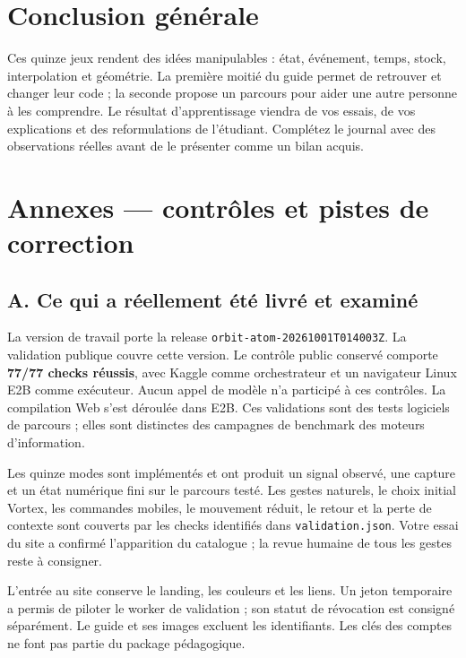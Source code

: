 \documentclass[
  canadien,
  11pt,
  letterpaper,
]{article}
\begin{document}
\section{Conclusion générale}\label{conclusion-guxe9nuxe9rale}

Ces quinze jeux rendent des idées manipulables : état, événement, temps,
stock, interpolation et géométrie. La première moitié du guide permet de
retrouver et changer leur code ; la seconde propose un parcours pour
aider une autre personne à les comprendre. Le résultat d'apprentissage
viendra de vos essais, de vos explications et des reformulations de
l'étudiant. Complétez le journal avec des observations réelles avant de
le présenter comme un bilan acquis.

\section{Annexes --- contrôles et pistes de
correction}\label{annexes-contruxf4les-et-pistes-de-correction}

\subsection{A. Ce qui a réellement été livré et
examiné}\label{a.-ce-qui-a-ruxe9ellement-uxe9tuxe9-livruxe9-et-examinuxe9}

La version de travail porte la release
\texttt{orbit-atom-20261001T014003Z}. La validation publique couvre
cette version. Le contrôle public conservé comporte \textbf{77/77 checks
réussis}, avec Kaggle comme orchestrateur et un navigateur Linux E2B
comme exécuteur. Aucun appel de modèle n'a participé à ces contrôles. La
compilation Web s'est déroulée dans E2B. Ces validations sont des tests
logiciels de parcours ; elles sont distinctes des campagnes de benchmark
des moteurs d'information.

Les quinze modes sont implémentés et ont produit un signal observé, une
capture et un état numérique fini sur le parcours testé. Les gestes
naturels, le choix initial Vortex, les commandes mobiles, le mouvement
réduit, le retour et la perte de contexte sont couverts par les checks
identifiés dans \texttt{validation.json}. Votre essai du site a confirmé
l'apparition du catalogue ; la revue humaine de tous les gestes reste à
consigner.

L'entrée au site conserve le landing, les couleurs et les liens. Un
jeton temporaire a permis de piloter le worker de validation ; son
statut de révocation est consigné séparément. Le guide et ses images
excluent les identifiants. Les clés des comptes ne font pas partie du
package pédagogique.
\end{document}
